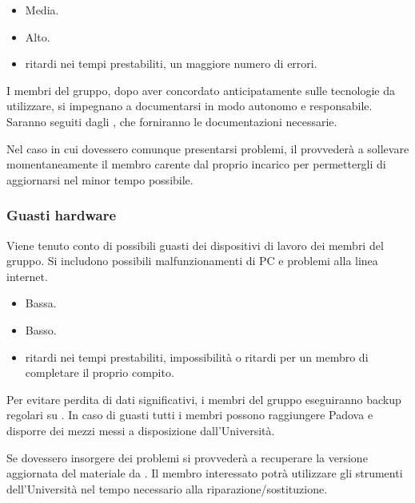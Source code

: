 \documentclass[a4paper, titlepage]{article}
\begin{document}
	\begin{itemize}
		\item {} Media.
		\item {} Alto.
		\item {} ritardi nei tempi prestabiliti, un maggiore numero di errori.
	\end{itemize}
	
	 I membri del gruppo, dopo aver concordato anticipatamente sulle tecnologie da utilizzare, si impegnano a documentarsi in modo autonomo e responsabile. Saranno seguiti dagli , che forniranno le documentazioni necessarie.
	 
	  Nel caso in cui dovessero comunque presentarsi problemi, il  provvederà a sollevare momentaneamente il membro carente dal proprio incarico per permettergli di aggiornarsi nel minor tempo possibile. 


\subsubsection{Guasti hardware}
 Viene tenuto conto di possibili guasti dei dispositivi di lavoro dei membri del gruppo. Si includono possibili malfunzionamenti di PC e problemi alla linea internet.
 
	\begin{itemize}
		\item {} Bassa.
		\item {} Basso.
		\item {} ritardi nei tempi prestabiliti, impossibilità o ritardi per un membro di completare il proprio compito.
	\end{itemize}
	
Per evitare perdita di dati significativi, i membri del gruppo eseguiranno backup regolari su . In caso di guasti tutti i membri possono raggiungere Padova e disporre dei mezzi messi a disposizione dall'Università.

Se dovessero insorgere dei problemi si provvederà a recuperare la versione aggiornata del materiale da .	Il membro interessato potrà utilizzare gli strumenti dell'Università nel tempo necessario alla riparazione/sostituzione.
\end{document}

